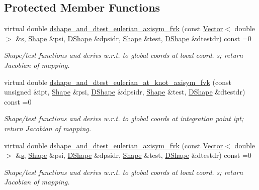 \subsection*{Protected Member Functions}
\begin{DoxyCompactItemize}
\item 
virtual double \hyperlink{classoomph_1_1AxisymFoepplvonKarmanEquations_a838cd424e2666b007113de0a95f5d999}{dshape\+\_\+and\+\_\+dtest\+\_\+eulerian\+\_\+axisym\+\_\+fvk} (const \hyperlink{classoomph_1_1Vector}{Vector}$<$ double $>$ \&\hyperlink{cfortran_8h_ab7123126e4885ef647dd9c6e3807a21c}{s}, \hyperlink{classoomph_1_1Shape}{Shape} \&psi, \hyperlink{classoomph_1_1DShape}{D\+Shape} \&dpsidr, \hyperlink{classoomph_1_1Shape}{Shape} \&test, \hyperlink{classoomph_1_1DShape}{D\+Shape} \&dtestdr) const =0
\begin{DoxyCompactList}\small\item\em Shape/test functions and derivs w.\+r.\+t. to global coords at local coord. s; return Jacobian of mapping. \end{DoxyCompactList}\item 
virtual double \hyperlink{classoomph_1_1AxisymFoepplvonKarmanEquations_a456a9c27c326d6d1e55e3ab822ac1a5f}{dshape\+\_\+and\+\_\+dtest\+\_\+eulerian\+\_\+at\+\_\+knot\+\_\+axisym\+\_\+fvk} (const unsigned \&ipt, \hyperlink{classoomph_1_1Shape}{Shape} \&psi, \hyperlink{classoomph_1_1DShape}{D\+Shape} \&dpsidr, \hyperlink{classoomph_1_1Shape}{Shape} \&test, \hyperlink{classoomph_1_1DShape}{D\+Shape} \&dtestdr) const =0
\begin{DoxyCompactList}\small\item\em Shape/test functions and derivs w.\+r.\+t. to global coords at integration point ipt; return Jacobian of mapping. \end{DoxyCompactList}\item 
virtual double \hyperlink{classoomph_1_1AxisymFoepplvonKarmanEquations_a838cd424e2666b007113de0a95f5d999}{dshape\+\_\+and\+\_\+dtest\+\_\+eulerian\+\_\+axisym\+\_\+fvk} (const \hyperlink{classoomph_1_1Vector}{Vector}$<$ double $>$ \&\hyperlink{cfortran_8h_ab7123126e4885ef647dd9c6e3807a21c}{s}, \hyperlink{classoomph_1_1Shape}{Shape} \&psi, \hyperlink{classoomph_1_1DShape}{D\+Shape} \&dpsidr, \hyperlink{classoomph_1_1Shape}{Shape} \&test, \hyperlink{classoomph_1_1DShape}{D\+Shape} \&dtestdr) const =0
\begin{DoxyCompactList}\small\item\em Shape/test functions and derivs w.\+r.\+t. to global coords at local coord. s; return Jacobian of mapping. \end{DoxyCompactList}\item 

\end{DoxyCompactItemize}
